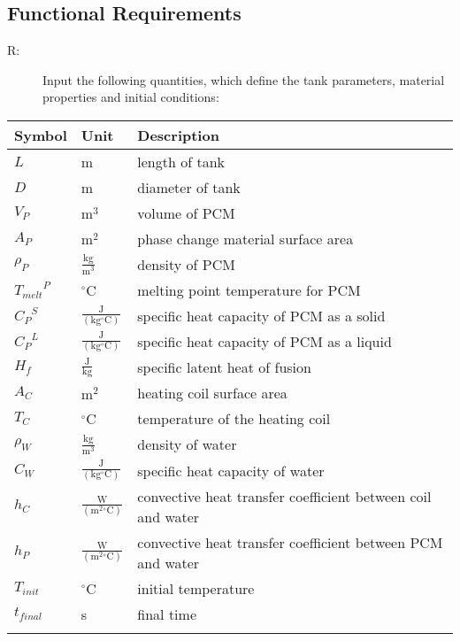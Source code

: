 \documentclass[12pt]{article}
\newcounter{reqnum}
\newcommand{\rthereqnum}{R\thereqnum}
\begin{document}
\subsection{Functional Requirements}
\label{Sec:FRs}
\begin{description}
\item[\rthereqnum\label{FR:req1}:]Input the following quantities, which define the tank parameters, material properties and initial conditions:
\end{description}
\begin{longtabu}{l l X[l]}
\toprule
Symbol & Unit & Description
\\
\midrule
$L$ & m & length of tank
\\
$D$ & m & diameter of tank
\\
${V_{P}}$ & $\text{m}^{3}$ & volume of PCM
\\
${A_{P}}$ & $\text{m}^{2}$ & phase change material surface area
\\
${ρ_{P}}$ & $\frac{\text{kg}}{\text{m}^{3}}$ & density of PCM
\\
${{T_{melt}}^{P}}$ & ${}^{\circ}$C & melting point temperature for PCM
\\
${{C_{P}}^{S}}$ & $\frac{\text{J}}{(\text{kg}{}^{\circ}\text{C})}$ & specific heat capacity of PCM as a solid
\\
${{C_{P}}^{L}}$ & $\frac{\text{J}}{(\text{kg}{}^{\circ}\text{C})}$ & specific heat capacity of PCM as a liquid
\\
${H_{f}}$ & $\frac{\text{J}}{\text{kg}}$ & specific latent heat of fusion
\\
${A_{C}}$ & $\text{m}^{2}$ & heating coil surface area
\\
${T_{C}}$ & ${}^{\circ}$C & temperature of the heating coil
\\
${ρ_{W}}$ & $\frac{\text{kg}}{\text{m}^{3}}$ & density of water
\\
${C_{W}}$ & $\frac{\text{J}}{(\text{kg}{}^{\circ}\text{C})}$ & specific heat capacity of water
\\
${h_{C}}$ & $\frac{\text{W}}{(\text{m}^{2}{}^{\circ}\text{C})}$ & convective heat transfer coefficient between coil and water
\\
${h_{P}}$ & $\frac{\text{W}}{(\text{m}^{2}{}^{\circ}\text{C})}$ & convective heat transfer coefficient between PCM and water
\\
${T_{init}}$ & ${}^{\circ}$C & initial temperature
\\
${t_{final}}$ & s & final time
\\
\bottomrule
\label{Table:InConstraints}
\end{longtabu}
\end{document}
